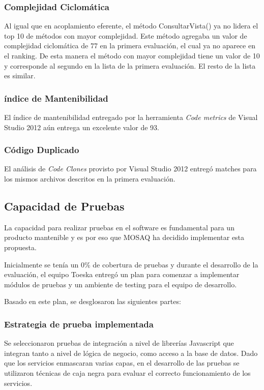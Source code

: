 \subsubsection{Complejidad Ciclomática}
Al igual que en acoplamiento eferente, el método ConsultarVista() ya no lidera el top 10 de métodos
con mayor complejidad. Este método agregaba un valor de complejidad 
ciclomática de 77 en la primera evaluación, el cual ya no aparece en el ranking. 
De esta manera el método con mayor complejidad tiene un valor de 10 y 
corresponde al segundo en la lista de la primera evaluación. El resto de la lista
es similar.
\subsubsection{índice de Mantenibilidad}
El índice de mantenibilidad entregado por la herramienta \textit{Code metrics} de Visual Studio 2012
aún entrega un excelente valor de 93.
\subsubsection{Código Duplicado}
El análisis de \textit{Code Clones} provisto por Visual Studio 2012 entregó matches para los 
mismos archivos descritos en la primera evaluación.
\subsection{Capacidad de Pruebas}
\label{cap}

La capacidad para realizar pruebas en el software es fundamental para un producto mantenible y es por eso
que MOSAQ ha decidido implementar esta propuesta.

Inicialmente se tenía un 0\% de cobertura de pruebas y durante el desarrollo de la evaluación, el equipo Toeska entregó un plan para comenzar a implementar
módulos de pruebas y un ambiente de testing para el equipo de desarrollo.

Basado en este plan, se desglosaron las siguientes partes: 
\subsubsection{Estrategia de prueba implementada}

Se seleccionaron pruebas de integración a nivel de librerías Javascript que 
integran tanto a nivel de lógica de negocio, como acceso a la base de datos. 
Dado que los servicios enmascaran varias capas, en el desarrollo de las pruebas 
se utilizaron técnicas de caja negra para evaluar el correcto funcionamiento 
de los servicios.

